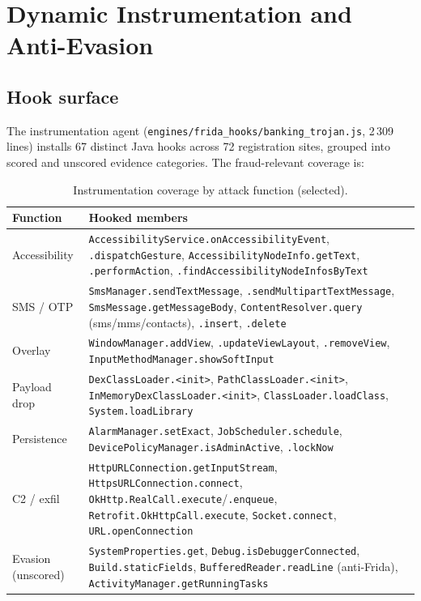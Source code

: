 \documentclass{article}
\begin{document}
\section{Dynamic Instrumentation and Anti-Evasion}
\label{sec:dyn}

\subsection{Hook surface}
\label{ssec:hooks}

The instrumentation agent (\texttt{engines/frida\_hooks/banking\_trojan.js},
2\,309 lines) installs 67 distinct Java hooks across 72 registration sites,
grouped into scored and unscored evidence categories. The fraud-relevant
coverage is:

\begin{table}[htb]
\centering
\caption{Instrumentation coverage by attack function (selected).}
\label{tab:hooks}
\begin{tabular}{@{}p{2.05cm}p{5.4cm}@{}}
\toprule
\textbf{Function} & \textbf{Hooked members} \\
\midrule
Accessibility &
\texttt{AccessibilityService.onAccessibilityEvent}, \texttt{.dispatchGesture},
\texttt{AccessibilityNodeInfo.getText}, \texttt{.performAction},
\texttt{.findAccessibilityNodeInfosByText} \\
\addlinespace
SMS / OTP &
\texttt{SmsManager.sendTextMessage}, \texttt{.sendMultipartTextMessage},
\texttt{SmsMessage.getMessageBody},
\texttt{ContentResolver.query} (sms/mms/contacts), \texttt{.insert},
\texttt{.delete} \\
\addlinespace
Overlay &
\texttt{WindowManager.addView}, \texttt{.updateViewLayout},
\texttt{.removeView}, \texttt{InputMethodManager.showSoftInput} \\
\addlinespace
Payload drop &
\texttt{DexClassLoader.<init>}, \texttt{PathClassLoader.<init>},
\texttt{InMemoryDexClassLoader.<init>}, \texttt{ClassLoader.loadClass},
\texttt{System.loadLibrary} \\
\addlinespace
Persistence &
\texttt{AlarmManager.setExact}, \texttt{JobScheduler.schedule},
\texttt{DevicePolicyManager.isAdminActive}, \texttt{.lockNow} \\
\addlinespace
C2 / exfil &
\texttt{HttpURLConnection.getInputStream}, \texttt{HttpsURLConnection.connect},
\texttt{OkHttp.RealCall.execute}/\texttt{.enqueue},
\texttt{Retrofit.OkHttpCall.execute}, \texttt{Socket.connect},
\texttt{URL.openConnection} \\
\addlinespace
Evasion (unscored) &
\texttt{SystemProperties.get}, \texttt{Debug.isDebuggerConnected},
\texttt{Build.staticFields}, \texttt{BufferedReader.readLine} (anti-Frida),
\texttt{ActivityManager.getRunningTasks} \\
\bottomrule
\end{tabular}
\end{table}
\end{document}
